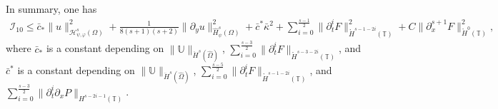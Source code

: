 \documentclass{amsart}
\numberwithin{equation}{section}
\begin{document}
In summary, one has
\begin{align*}
\mathcal{I}_{10}
\leq \bar{c}_{*}\|u\|_{\mathcal{H}_{\psi,\varphi}^{s}(\Omega)}^{2}
    +\frac{1}{8(s+1)(s+2)}\|\partial_{y}u\|_{\hat{H}_{\psi}^{s}(\Omega)}^{2}
    +\bar{c}^{*}\bar{\kappa}^{2}
    +\sum_{i=0}^{\frac{s-1}{2}}\|\partial_{t}^{i}F\|_{\mathring{H}^{s-1-2i}(\mathbb{T})}^{2}
    +C\|\partial_{x}^{s+1}F\|_{\mathring{H}^{0}(\mathbb{T})}^{2},
\end{align*}
where $\bar{c}_{*}$ is a constant depending on $\|\mathbb{U}\|_{\ddot{H}^{s}(\hat{\Omega})}$,
$\sum\limits_{i=0}^{\frac{s-3}{2}}\|\partial_{t}^{i}F\|_{\mathring{H}^{s-3-2i}(\mathbb{T})}$,
and $\bar{c}^{*}$ is a constant depending on $\|\mathbb{U}\|_{\ddot{H}^{s}(\hat{\Omega})}$,
$\sum\limits_{i=0}^{\frac{s-5}{2}}\|\partial_{t}^{i}F\|_{\mathring{H}^{s-1-2i}(\mathbb{T})}$,
and $\sum\limits_{i=0}^{\frac{s-3}{2}}\|\partial_{t}^{i}\partial_{x}P\|_{H^{s-2i-1}(\mathbb{T})}$.
\end{document}

